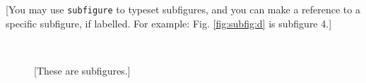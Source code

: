 \documentclass[a4paper,11pt,onecolumn,twoside]{article}
\begin{document}
[You may use \texttt{subfigure} to typeset subfigures, and you can make a reference to a specific subfigure, if labelled. For example: Fig. \ref{fig:subfig:d} is subfigure 4.]
  \begin{figure}[H]
    \centering
    \hspace{1in}
    \hspace{1in} \\
    \hspace{1in}
    \caption{[These are subfigures.]}
    \label{fig:subfig}
  \end{figure}
\end{document}
